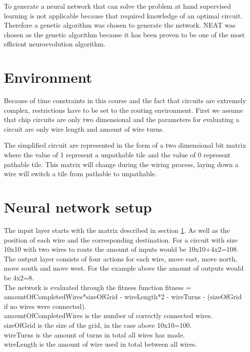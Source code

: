 \documentclass{kththesis}
\begin{document}
To generate a neural network that can solve the problem at hand supervised learning is not applicable because that required knowledge of an optimal circuit. Therefore a genetic algorithm was chosen to generate the network. NEAT was chosen as the genetic algorithm because it has been proven to be one of the most efficient neuroevolution algorithm.
 
\section{Environment}
\label{sec:Environment}
Because of time constraints in this course and the fact that circuits are extremely complex, restrictions have to be set to the routing environment. First we assume that chip circuits are only two dimensional and the parameters for evaluating a circuit are only wire length and amount of wire turns.
 
The simplified circuit are represented in the form of a two dimensional bit matrix where the value of 1 represent a unpathable tile and the value of 0 represent pathable tile. This matrix will change during the wiring process, laying down a wire will switch a tile from pathable to unpathable. 
 
\section{Neural network setup}
The input layer starts with the matrix described in section \ref{sec:Environment}. As well as the position of each wire and the corresponding destination. For a circuit with size 10x10 with two wires to route the amount of inputs would be 10x10+4x2=108. The output layer consists of four actions for each wire, move east, move north, move south and move west. For the example above the amount of outputs would be 4x2=8.\\
 
The network is evaluated through the fitness function
fitness = amountOfCompletedWires*sizeOfGrid - wireLength*2 - wireTurns - (sizeOfGrid if no wires were connected).\\
 
amountOfCompletedWires is the number of correctly connected wires.\\
sizeOfGrid is the size of the grid, in the case above 10x10=100.\\
wireTurns is the amount of turns in total all wires has made.\\
wireLength is the amount of wire used in total between all wires.\\
 
\end{document}

